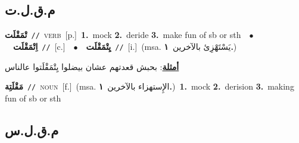 \documentclass[10pt,a4paper,twoside]{article} %
\begin{document}
\begin{multicols}{2}
\vspace{-3mm}
\subsection*{\color{blue}\foreignlanguage{arabic}{م.ق.ل.ت}\color{blue}{}} 

{\setlength\topsep{0pt}\textbf{\foreignlanguage{arabic}{تْمَقْلَت}}\ {\color{gray}\texttt{//}\color{black}}\ \textsc{verb}\ [p.]\ \textbf{1.}~mock  \textbf{2.}~deride  \textbf{3.}~make fun of sb or sth\ \ $\bullet$\ \ \setlength\topsep{0pt}\textbf{\foreignlanguage{arabic}{اِتْمَقْلَت}}\ {\color{gray}\texttt{//}\color{black}}\ [c.]\ \ $\bullet$\ \ \setlength\topsep{0pt}\textbf{\foreignlanguage{arabic}{يِتْمَقْلَت}}\ {\color{gray}\texttt{//}\color{black}}\ [i.]\ \color{gray}(msa. \foreignlanguage{arabic}{يَسْتَهْزِئ بالآخرين}~\foreignlanguage{arabic}{\textbf{١.}})\color{black}\  \begin{flushright}\color{gray}\foreignlanguage{arabic}{\textbf{\underline{\foreignlanguage{arabic}{أمثلة}}}: بحبش قعدتهم عشان بيضلوا يِتْمَقْلَتوا عالناس}\end{flushright}\color{black}} \vspace{2mm}

{\setlength\topsep{0pt}\textbf{\foreignlanguage{arabic}{مَقْلَتِة}}\ {\color{gray}\texttt{//}\color{black}}\ \textsc{noun}\ [f.]\ \color{gray}(msa. \foreignlanguage{arabic}{الإِستهزاء بالآخرين}~\foreignlanguage{arabic}{\textbf{١.}})\color{black}\ \textbf{1.}~mock  \textbf{2.}~derision  \textbf{3.}~making fun of sb or sth\ } \vspace{2mm}

\vspace{-3mm}
\subsection*{\color{blue}\foreignlanguage{arabic}{م.ق.ل.س}\color{blue}{}} 


\end{multicols}
\end{document}
